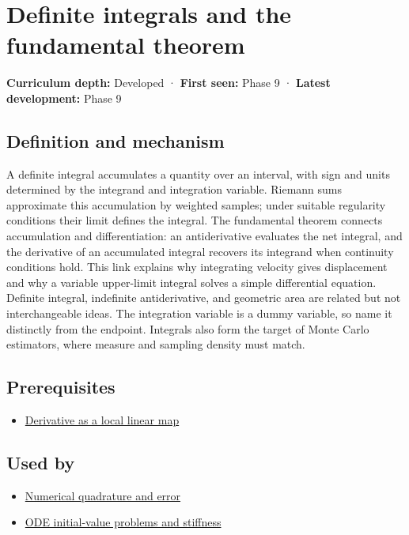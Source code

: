 \hypertarget{appendix-1a50e72435c2}{}
\section{Definite integrals and the fundamental theorem}\label{appendix-1a50e72435c2-definite-integrals-and-the-fundamental-theorem}

\textbf{Curriculum depth:} Developed · \textbf{First seen:} Phase 9 · \textbf{Latest development:} Phase 9

\subsection{Definition and mechanism}\label{appendix-1a50e72435c2-definition-and-mechanism}

A definite integral accumulates a quantity over an interval, with sign and units determined by the integrand and integration variable. Riemann sums approximate this accumulation by weighted samples; under suitable regularity conditions their limit defines the integral. The fundamental theorem connects accumulation and differentiation: an antiderivative evaluates the net integral, and the derivative of an accumulated integral recovers its integrand when continuity conditions hold. This link explains why integrating velocity gives displacement and why a variable upper-limit integral solves a simple differential equation. Definite integral, indefinite antiderivative, and geometric area are related but not interchangeable ideas. The integration variable is a dummy variable, so name it distinctly from the endpoint. Integrals also form the target of Monte Carlo estimators, where measure and sampling density must match.

\subsection{Prerequisites}\label{appendix-1a50e72435c2-prerequisites}

\begin{itemize}
\tightlist
\item
  \hyperref[appendix-7bc181935c42]{Derivative as a local linear map}
\end{itemize}

\subsection{Used by}\label{appendix-1a50e72435c2-used-by}

\begin{itemize}
\tightlist
\item
  \hyperref[appendix-80521eae6b71]{Numerical quadrature and error}
\item
  \hyperref[appendix-e8ab9836882e]{ODE initial-value problems and stiffness}
\end{itemize}

